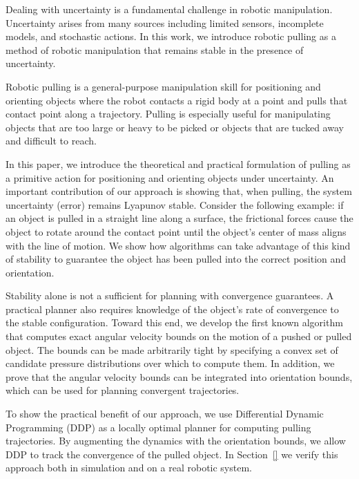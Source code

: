 \documentclass[conference]{IEEEtran}
\begin{document}

Dealing with uncertainty is a fundamental challenge in robotic
manipulation. Uncertainty arises from many sources including limited
sensors, incomplete models, and stochastic actions. In this work, we
introduce robotic pulling as a method of robotic manipulation that
remains stable in the presence of uncertainty.

Robotic pulling is a general-purpose manipulation skill for positioning and
orienting objects where the robot contacts a
rigid body at a point and pulls that contact point along a
trajectory. Pulling is especially useful for manipulating objects that are too
large or heavy to be picked or objects that are tucked away and difficult
to reach.

In this paper, we introduce the theoretical and
practical formulation of pulling as a primitive action for positioning
and orienting objects under uncertainty. An important contribution of
our approach is showing that, when pulling, %
the system uncertainty (error) remains Lyapunov stable. %
%
Consider the following example: if an object is pulled
in a straight line along a surface, the frictional forces cause the
object to rotate around the contact point until the object's center of
mass aligns with the line of motion. We show how algorithms can take advantage of
this kind of stability to guarantee the object has been pulled into the
correct position and orientation.

Stability alone is not a sufficient for planning with convergence guarantees. %
A practical planner also requires knowledge of
the object's rate of convergence to the stable configuration. Toward this
end, we develop the first known algorithm that computes exact angular
velocity bounds on the motion of a pushed or pulled object. The bounds
can be made arbitrarily tight by specifying a convex set of candidate
pressure distributions over which to compute them. In addition, we prove
that the angular velocity bounds can be integrated into orientation
bounds, which can be used for planning convergent trajectories.

To show the practical benefit of our approach, we use Differential Dynamic Programming (DDP) as a
locally optimal planner for computing pulling trajectories. By
augmenting the dynamics with the orientation bounds, we allow DDP to
track the convergence of the pulled object. In Section~\ref{} we verify this approach 
both in simulation and on a real robotic system.
\end{document}
